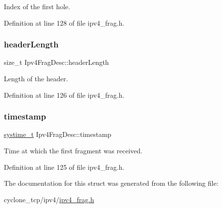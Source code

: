 Index of the first hole. 



Definition at line 128 of file ipv4\+\_\+frag.\+h.

\mbox{\label{structIpv4FragDesc_a252d5cce2a3261863d1f4a55e33d4fdc}} 
\subsubsection{\texorpdfstring{header\+Length}{headerLength}}
{\footnotesize\ttfamily size\+\_\+t Ipv4\+Frag\+Desc\+::header\+Length}



Length of the header. 



Definition at line 126 of file ipv4\+\_\+frag.\+h.

\mbox{\label{structIpv4FragDesc_a1cbafc6835eb22a2945d4bef3090d82a}} 
\subsubsection{\texorpdfstring{timestamp}{timestamp}}
{\footnotesize\ttfamily \hyperlink{compiler__port_8h_ae3e32a98d431a02106616da3071832dd}{systime\+\_\+t} Ipv4\+Frag\+Desc\+::timestamp}



Time at which the first fragment was received. 



Definition at line 125 of file ipv4\+\_\+frag.\+h.



The documentation for this struct was generated from the following file\+:\begin{DoxyCompactItemize}
\item 
cyclone\+\_\+tcp/ipv4/\hyperlink{ipv4__frag_8h}{ipv4\+\_\+frag.\+h}\end{DoxyCompactItemize}
